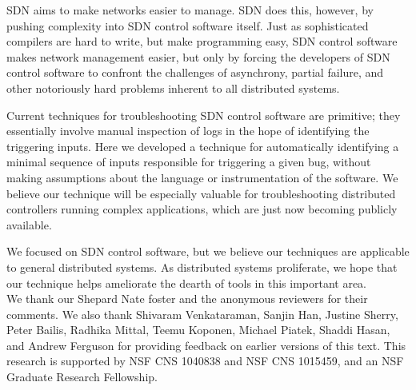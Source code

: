 
SDN aims to make networks easier to manage. SDN
does this, however, by pushing complexity into SDN control software itself. Just
as sophisticated compilers are hard to write, but make programming easy, SDN
control software makes network management easier, but only by forcing the
developers of SDN control software to confront the challenges of asynchrony,
partial failure, and other notoriously hard problems inherent to all distributed
systems.

Current techniques for troubleshooting SDN control software are primitive; they
essentially involve manual inspection of logs in the hope of identifying the
triggering inputs. Here we developed a technique for automatically
identifying a minimal sequence of inputs responsible for triggering a given
bug, without making assumptions about the language or instrumentation of the
software. We believe our technique will be especially valuable for troubleshooting
distributed controllers running complex applications, which are just now
becoming publicly available.

We focused on SDN control software, but we believe our techniques
are applicable to general distributed systems. As distributed systems
proliferate, we hope that our technique helps ameliorate the dearth of
tools in this important area.\\[0.4ex]
%
 We thank our Shepard Nate foster and the
anonymous reviewers for their comments.
We also thank Shivaram Venkataraman, Sanjin Han, Justine Sherry, Peter Bailis, Radhika Mittal, Teemu
Koponen, Michael Piatek, Shaddi Hasan, and Andrew Ferguson for providing feedback on earlier versions of this
text. This research is supported by NSF CNS
1040838 and NSF CNS 1015459, and an NSF Graduate Research Fellowship.
\vspace{-1em}



